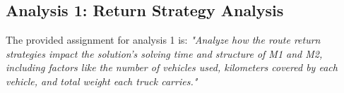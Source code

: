\vspace{1cm}
\subsection{Analysis 1: Return Strategy Analysis}
The provided assignment for analysis 1 is: \textit{"Analyze how the route return strategies impact the solution’s solving time and structure of M1 and M2, including factors like the number of vehicles used, kilometers covered by each vehicle, and total weight each truck carries."}




\newpage